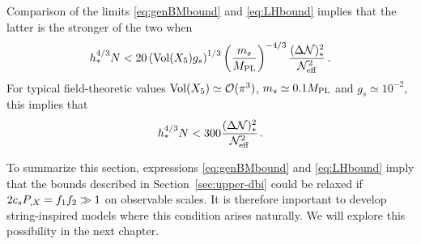 Comparison of the limits \eqref{eq:genBMbound} and \eqref{eq:LHbound}
implies that the latter is the stronger of the two when
% 
\begin{equation}
\label{eq:LHstronger}
h_*^{4/3}N < 20 \left( \mathrm{Vol} (X_5) g_s \right)^{1/3}  
\left( \frac{m_s}{M_{\mathrm{PL}}} \right)^{-4/3} 
\frac{( \Delta \mathcal{N} )_*^2}{\mathcal{N}_\mathrm{eff}^2} \,.
\end{equation}
% 
For typical field-theoretic values $\mathrm{Vol} (X_5) \simeq \mathcal{O}(\pi^3)$, $m_s \simeq
0.1 M_{\mathrm{PL}}$ 
and  $g_s \simeq 10^{-2}$, this implies that
%  
\begin{equation}
\label{eq:LHstronger1}
h_*^{4/3} N < 300 \frac{(\Delta \mathcal{N})^2_*}{\mathcal{N}_\mathrm{eff}^2} \,.
\end{equation}
% 

To summarize this section, 
expressions \eqref{eq:genBMbound} and \eqref{eq:LHbound} imply that the 
bounds described in Section~\ref{sec:upper-dbi}
could be relaxed if $2c_sP_{,X} = f_1f_2 \gg 1$ on observable scales. 
It is therefore important to develop string-inspired models 
where this condition arises naturally. We will explore this possibility in the
next chapter.


